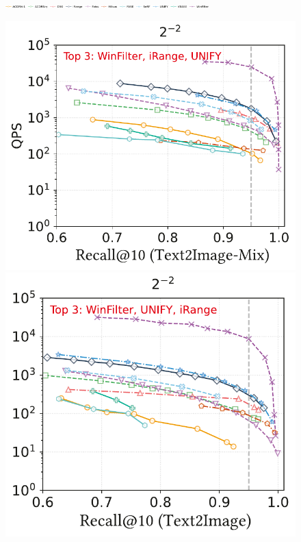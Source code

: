 \documentclass[sigconf, nonacm, pdfa]{acmart}
\begin{document}
{	
	
	
	
\begin{figure}
	\centering
	\includegraphics[width=0.7\textwidth]{figures/exp/range_legend.pdf}
	
	\begin{minipage}[t]{0.36\textwidth}
		\centering
		\includegraphics[width=0.495\linewidth]{figures/exp/range_multimodel.pdf}
		\hfill 
		\includegraphics[width=0.47\linewidth]{figures/exp/range_multimodel_1.pdf}


\end{minipage}
\end{figure}}
\end{document}
